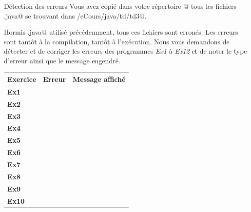 \documentclass[a4paper,11pt]{article}
\begin{document}
			
			\begin{Exercice}{D\'etection des erreurs} 
			        Vous avez copi\'e dans votre r\'epertoire @ tous les fichiers \verb@.java@ se trouvant dans \verb@/eCours/java/td/td3@.  
        
            			\par
          
          			Hormis \verb@Ex.java@ utilis\'e pr\'ec\'edemment, tous ces fichiers sont erron\'es.  Les erreurs sont tant\^ot \`a la compilation, tant\^ot \`a l'ex\'ecution. Nous 					vous demandons de d\'etecter et de corriger les erreurs des programmes \textit{Ex1} \`a \textit{Ex12} et de noter le type d'erreur ainsi que le message 						engendr\'e.  
        
            			\par
        
				\par
               			 \begin{longtable}{|p{15.87mm}|p{15.876mm}|p{79.38mm}|}
                				\hline
					\endhead
        					\endfoot
        					 \bfseries Exercice \mdseries & \bfseries Erreur \mdseries & \bfseries Message affich\'e  \mdseries \\ \hline		
		 			\bfseries Ex1  \mdseries & & \\ \hline		
		 			\bfseries Ex2  \mdseries & & \\ \hline		
					 \bfseries Ex3 \mdseries & & \\ \hline		
		 			\bfseries Ex4 \mdseries & & \\ \hline		
		 			\bfseries Ex5  \mdseries & & \\ \hline		
					 \bfseries Ex6 \mdseries & & \\ \hline		
					 \bfseries Ex7 \mdseries & & \\ \hline		
		 			\bfseries Ex8 \mdseries & & \\ \hline		
					 \bfseries Ex9  \mdseries & & \\ \hline		
					 \bfseries Ex10 \mdseries & & \\ \hline		
				\end{longtable}
			\end{Exercice}
\end{document}
